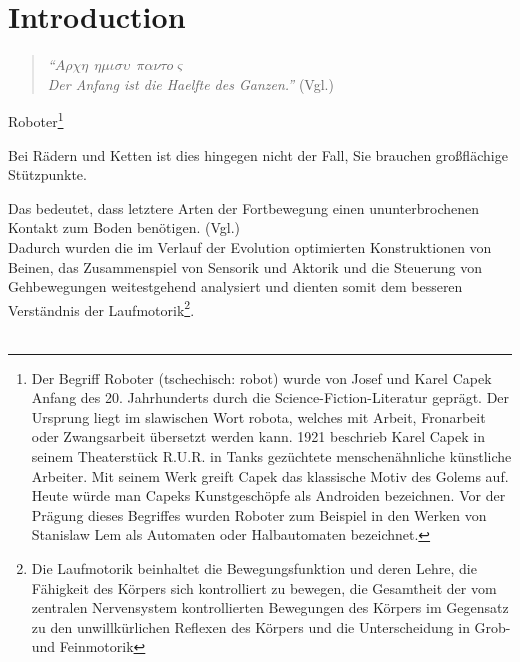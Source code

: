 \chapter*{Introduction}


\begin{quotation}
\textit{\enquote{$A\rho\chi\eta\ \ \eta\mu\iota\sigma\upsilon\ \ \pi\alpha\nu\tau o \varsigma$ \\Der Anfang ist die Haelfte des Ganzen.}} (Vgl.\cite{111})
\end{quotation} 

Roboter\footnote{Der Begriff Roboter (tschechisch: robot) wurde von Josef und Karel Capek Anfang des 20. Jahrhunderts durch die Science-Fiction-Literatur geprägt. Der Ursprung liegt im slawischen Wort robota, welches mit Arbeit, Fronarbeit oder Zwangsarbeit übersetzt werden kann. 1921 beschrieb Karel Capek in seinem Theaterstück R.U.R. in Tanks gezüchtete menschenähnliche künstliche Arbeiter. Mit seinem Werk greift Capek das klassische Motiv des Golems auf. Heute würde man Capeks Kunstgeschöpfe als Androiden bezeichnen. Vor der Prägung dieses Begriffes wurden Roboter zum Beispiel in den Werken von Stanislaw Lem als Automaten oder Halbautomaten bezeichnet.}

Bei Rädern und Ketten ist dies hingegen nicht der Fall, Sie brauchen gro\ss flächige Stützpunkte. 

Das bedeutet, dass letztere Arten der Fortbewegung einen ununterbrochenen Kontakt zum Boden benötigen. (Vgl.\cite{116})\\

Dadurch wurden die im Verlauf der Evolution optimierten Konstruktionen von Beinen, das Zusammenspiel von Sensorik und Aktorik und die Steuerung von Gehbewegungen weitestgehend analysiert und dienten somit dem besseren Verständnis der Laufmotorik\footnote{Die Laufmotorik beinhaltet die Bewegungsfunktion und deren Lehre, die Fähigkeit des Körpers sich kontrolliert zu bewegen, die Gesamtheit der vom zentralen Nervensystem kontrollierten Bewegungen des Körpers im Gegensatz zu den unwillkürlichen Reflexen des Körpers und die Unterscheidung in Grob- und Feinmotorik}.\\\\ 

